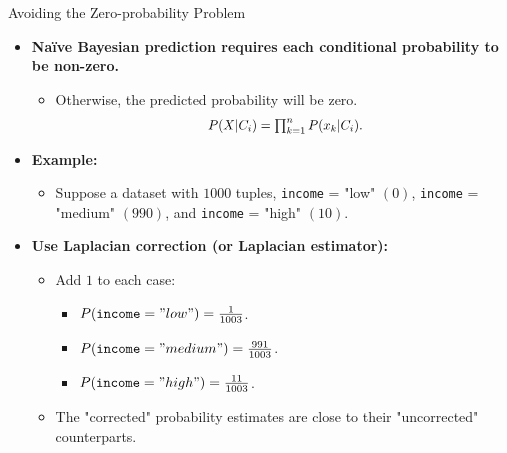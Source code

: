 \begin{frame}{Avoiding the Zero-probability Problem}
  \begin{itemize}
  \item \textbf{Naïve Bayesian prediction requires each conditional probability to be non-zero.}
    \begin{itemize}
    \item Otherwise, the predicted probability will be zero.
      \begin{align}
        \resizebox{4cm}{!}{
        $P(X|C_i) = \prod_{k=1}^{n} P(x_k|C_i).$}
      \end{align}
    \end{itemize}
  \item \textbf{Example:}
    \begin{itemize}
    \item Suppose a dataset with $1000$ tuples, \texttt{income} = "low" $(0)$, \texttt{income} = "medium" $(990)$, and \texttt{income} = "high" $(10)$.
    \end{itemize}
  \item \textbf{Use {\color{airforceblue}Laplacian correction} (or Laplacian estimator):}
    \begin{itemize}
    \item Add $1$ to each case:
      \begin{itemize}
      \item $P(\texttt{income} = "low") = \frac{1}{1003}$.
      \item $P(\texttt{income} = "medium") = \frac{991}{1003}$.
      \item $P(\texttt{income} = "high") = \frac{11}{1003}$.
      \end{itemize}
    \item The "corrected" probability estimates are close to their "uncorrected" counterparts.
    \end{itemize}
  \end{itemize}
\end{frame}

